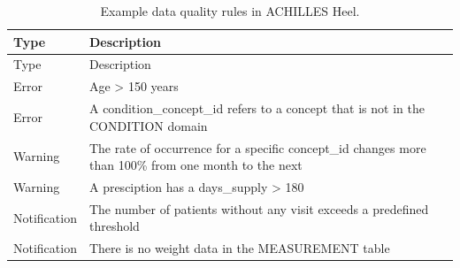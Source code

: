\documentclass[11pt]{book}
\theoremstyle{definition}
\theoremstyle{definition}
\theoremstyle{definition}
\theoremstyle{remark}
\begin{document}
\begin{longtable}[]{@{}ll@{}}
\caption{\label{tab:heelExamples} Example data quality rules in ACHILLES Heel.}\tabularnewline
\toprule
\begin{minipage}[b]{0.15\columnwidth}\raggedright
Type\strut
\end{minipage} & \begin{minipage}[b]{0.79\columnwidth}\raggedright
Description\strut
\end{minipage}\tabularnewline
\midrule
\endfirsthead
\toprule
\begin{minipage}[b]{0.15\columnwidth}\raggedright
Type\strut
\end{minipage} & \begin{minipage}[b]{0.79\columnwidth}\raggedright
Description\strut
\end{minipage}\tabularnewline
\midrule
\endhead
\begin{minipage}[t]{0.15\columnwidth}\raggedright
Error\strut
\end{minipage} & \begin{minipage}[t]{0.79\columnwidth}\raggedright
Age \textgreater{} 150 years\strut
\end{minipage}\tabularnewline
\begin{minipage}[t]{0.15\columnwidth}\raggedright
Error\strut
\end{minipage} & \begin{minipage}[t]{0.79\columnwidth}\raggedright
A condition\_concept\_id refers to a concept that is not in the CONDITION domain\strut
\end{minipage}\tabularnewline
\begin{minipage}[t]{0.15\columnwidth}\raggedright
Warning\strut
\end{minipage} & \begin{minipage}[t]{0.79\columnwidth}\raggedright
The rate of occurrence for a specific concept\_id changes more than 100\% from one month to the next\strut
\end{minipage}\tabularnewline
\begin{minipage}[t]{0.15\columnwidth}\raggedright
Warning\strut
\end{minipage} & \begin{minipage}[t]{0.79\columnwidth}\raggedright
A presciption has a days\_supply \textgreater{} 180\strut
\end{minipage}\tabularnewline
\begin{minipage}[t]{0.15\columnwidth}\raggedright
Notification\strut
\end{minipage} & \begin{minipage}[t]{0.79\columnwidth}\raggedright
The number of patients without any visit exceeds a predefined threshold\strut
\end{minipage}\tabularnewline
\begin{minipage}[t]{0.15\columnwidth}\raggedright
Notification\strut
\end{minipage} & \begin{minipage}[t]{0.79\columnwidth}\raggedright
There is no weight data in the MEASUREMENT table\strut
\end{minipage}\tabularnewline
\bottomrule
\end{longtable}
\end{document}
